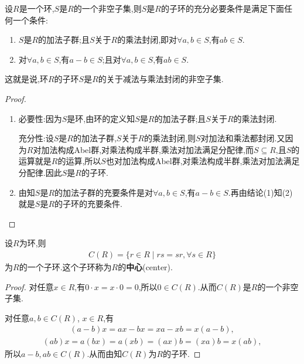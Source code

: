 \documentclass[../../main.tex]{subfiles}%
\begin{document}
\begin{theorem}\label{theorem:子环的充要条件--抽象代数}
设$R$是一个环,$S$是$R$的一个非空子集,则$S$是$R$的子环的充分必要条件是满足下面任何一个条件:
\begin{enumerate}[(1)]
\item\label{theorem:子环的充要条件--抽象代数-1} $S$是$R$的加法子群;且$S$关于$R$的乘法封闭,即对$\forall a,b\in S$,有$ab\in S$.

\item\label{theorem:子环的充要条件--抽象代数-2} 对$\forall a,b\in S$,有$a-b\in S$;且对$\forall a,b\in S$,有$ab\in S$.
\end{enumerate}
\end{theorem}
\begin{remark}
这就是说,环$R$的子环$S$是$R$的关于减法与乘法封闭的非空子集.
\end{remark}
\begin{proof}
\begin{enumerate}[(1)]
\item {\heiti 必要性:}因为$S$是环,由环的定义知$S$是$R$的加法子群;且$S$关于$R$的乘法封闭.

{\heiti 充分性:}设$S$是$R$的加法子群,$S$关于$R$的乘法封闭,则$S$对加法和乘法都封闭.又因为$R$对加法构成Abel群,对乘法构成半群,乘法对加法满足分配律,而$S\subseteq R$,且$S$的运算就是$R$的运算,所以$S$也对加法构成Abel群,对乘法构成半群,乘法对加法满足分配律.因此$S$是$R$的子环.

\item 由知$S$是$R$的加法子群的充要条件是对$\forall a,b\in S$,有$a-b\in S$.再由结论(1)知(2)就是$S$是$R$的子环的充要条件.
\end{enumerate}

\end{proof}

\begin{theorem}
设$R$为环,则
\begin{align*}
C(R) = \{r \in R \mid rs = sr, \forall s \in R\}
\end{align*}
为$R$的一个子环.这个子环称为$R$的\textbf{中心}(center).
\end{theorem}
\begin{proof}

对任意$x \in R$,有$0 \cdot x = x \cdot 0 = 0$,所以$0 \in C(R)$.从而$C(R)$是$R$的一个非空子集.

对任意$a,b \in C(R)$, $x \in R$,有
\begin{align*}
(a - b)x = ax - bx = xa - xb = x(a - b),
\end{align*}
\begin{align*}
(ab)x = a(bx) = a(xb) = (ax)b = (xa)b = x(ab),
\end{align*}
所以$a - b, ab \in C(R)$.从而由知$C(R)$为$R$的子环.

\end{proof}
\end{document}
